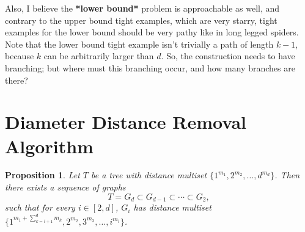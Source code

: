 \documentclass[12]{article}
\DeclareMathOperator{\mult}{mult}
\newtheorem{prop}[thm]{Proposition}
\theoremstyle{definition}
\begin{document}
	Also, I believe the \textbf{*lower bound*} problem is approachable as well, and contrary to the upper bound tight examples, which are very starry, tight examples for the lower bound should be very pathy like in long legged spiders.  Note that the lower bound tight example isn't trivially a path of length $k-1$, because $k$ can be arbitrarily larger than $d$.  So, the construction needs to have branching; but where must this branching occur, and how many branches are there?
	
	\newpage
	
	\section{Diameter Distance Removal Algorithm}
	
	\begin{prop}
		Let $T$ be a tree with distance multiset $\{1^{m_1}, 2^{m_2}, \ldots, d^{m_d}\}$.  Then there exists a sequence of graphs 
		$$T = G_d \subset G_{d-1} \subset \cdots \subset G_{2},$$
		such that for every $i \in [2,d]$, $G_i$ has distance multiset  $\{1^{m_1 + \sum_{k=i+1}^{d} m_{k}}, 2^{m_2}, 3^{m_3}, \ldots, i^{m_i}\}$.%
	\end{prop}
	
\end{document}
